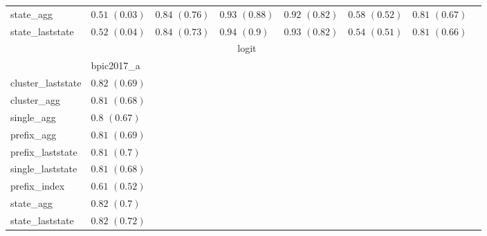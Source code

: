 \documentclass[twoside,11pt]{Latex/Classes/PhDthesisPSnPDF}
\begin{document}
\begin{table}[h]
{\begin{tabular}{llllllll}
			state\_agg & $0.51$ ${(0.03)}$ & $0.84$ ${(0.76)}$ & $0.93$ ${(0.88)}$ & $0.92$ ${(0.82)}$ & $0.58$ ${(0.52)}$ & $0.81$ ${(0.67)}$ \\
			state\_laststate & $0.52$ ${(0.04)}$ & $0.84$ ${(0.73)}$ & $0.94$ ${(0.9)}$ & $0.93$ ${(0.82)}$ & $0.54$ ${(0.51)}$ & $0.81$ ${(0.66)}$ \\
			\bottomrule
			\toprule
			& \multicolumn{5}{c}{logit}
			\\
			& bpic2017\_a
			\\ \midrule
			cluster\_laststate & $0.82$ ${(0.69)}$ \\
			cluster\_agg & $0.81$ ${(0.68)}$ \\
			single\_agg & $0.8$ ${(0.67)}$ \\
			prefix\_agg & $0.81$ ${(0.69)}$ \\
			prefix\_laststate & $0.81$ ${(0.7)}$ \\
			single\_laststate & $0.81$ ${(0.68)}$ \\
			prefix\_index & $0.61$ ${(0.52)}$ \\
			state\_agg & $0.82$ ${(0.7)}$ \\
			state\_laststate & $0.82$ ${(0.72)}$ \\
			\bottomrule
			
			
			
		\end{tabular}%
	}
\end{table}
\end{document}
